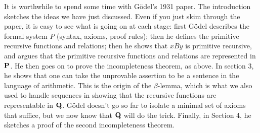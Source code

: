 \documentclass[../../../include/open-logic-section]{subfiles}
\begin{document}


It is worthwhile to spend some time with G\"odel's 1931
paper. The introduction sketches the ideas we have just discussed.
Even if you just skim through the paper, it is easy to see what is
going on at each stage: first G\"odel describes the formal system $P$
(syntax, axioms, proof rules); then he defines the primitive recursive
functions and relations; then he shows that $x B y$ is primitive
recursive, and argues that the primitive recursive functions and
relations are represented in $\mathbf{P}$. He then goes on to prove the
incompleteness theorem, as above. In section 3, he shows that one can
take the unprovable assertion to be a sentence in the language of
arithmetic. This is the origin of the $\beta$-lemma, which is what we
also used to handle sequences in showing that the recursive functions
are representable in $\mathbf{Q}$. G\"odel doesn't go so far to isolate a
minimal set of axioms that suffice, but we now know that $\mathbf{Q}$ will do
the trick.  Finally, in Section 4, he sketches a proof of the second
incompleteness theorem.
\end{document}
